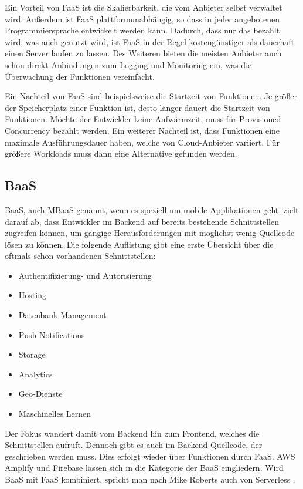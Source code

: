 Ein Vorteil von \ac{FaaS} ist die Skalierbarkeit, die vom Anbieter selbst verwaltet wird. Außerdem ist \ac{FaaS} plattformunabhängig, so dass in jeder angebotenen Programmiersprache entwickelt werden kann. Dadurch, dass nur das bezahlt wird, was auch genutzt wird, ist \ac{FaaS} in der Regel kostengünstiger als dauerhaft einen Server laufen zu lassen. Des Weiteren bieten die meisten Anbieter auch schon direkt Anbindungen zum Logging und Monitoring ein, was die Überwachung der Funktionen vereinfacht.

Ein Nachteil von \ac{FaaS} sind beispielsweise die Startzeit von Funktionen. Je größer der Speicherplatz einer Funktion ist, desto länger dauert die Startzeit von Funktionen. Möchte der Entwickler keine Aufwärmzeit, muss für Provisioned Concurrency bezahlt werden. Ein weiterer Nachteil ist, dass Funktionen eine maximale Ausführungsdauer haben, welche von Cloud-Anbieter variiert. Für größere Workloads muss dann eine Alternative gefunden werden.

\subsection{\acl{BaaS}}

\acf{BaaS}, auch \ac{MBaaS} genannt, wenn es speziell um mobile Applikationen geht, zielt darauf ab, dass Entwickler im Backend auf bereits bestehende Schnittstellen zugreifen können, um gängige Herausforderungen mit möglichst wenig Quellcode lösen zu können. Die folgende Auflistung gibt eine erste Übersicht über die oftmals schon vorhandenen Schnittstellen:
\begin{itemize}
  \item Authentifizierung- und Autorisierung
  \item Hosting
  \item Datenbank-Management
  \item Push Notifications
  \item Storage
  \item Analytics
  \item Geo-Dienste
  \item Maschinelles Lernen
\end{itemize}

Der Fokus wandert damit vom Backend hin zum Frontend, welches die Schnittstellen aufruft. Dennoch gibt es auch im Backend Quellcode, der geschrieben werden muss. Dies erfolgt wieder über Funktionen durch \ac{FaaS}. \ac{AWS} Amplify und Firebase lassen sich in die Kategorie der \ac{BaaS} eingliedern. Wird \ac{BaaS} mit \ac{FaaS} kombiniert, spricht man nach Mike Roberts auch von Serverless \autocite{brandon2017serverless}.


